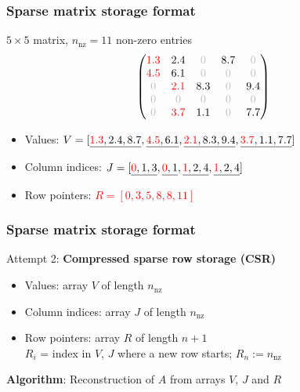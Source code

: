 \documentclass{beamer}
\begin{document}

\begin{frame}[fragile]
  \frametitle{Sparse matrix storage format}
  $5\times 5$ matrix, $n_{\text{nz}}=11$ non-zero entries
$$
\begin{pmatrix}
\textcolor{red}{1.3} & 2.4 & \textcolor{lightgray}{0} & 8.7 & \textcolor{lightgray}{0} \\
\textcolor{red}{4.5} & 6.1 & \textcolor{lightgray}{0} & \textcolor{lightgray}{0} & \textcolor{lightgray}{0} \\
\textcolor{lightgray}{0} & \textcolor{red}{2.1} & 8.3 & \textcolor{lightgray}{0} & 9.4 \\
\textcolor{lightgray}{0} & \textcolor{lightgray}{0} & \textcolor{lightgray}{0} & \textcolor{lightgray}{0} & \textcolor{lightgray}{0} \\
\textcolor{lightgray}{0} & \textcolor{red}{3.7} & 1.1 & \textcolor{lightgray}{0} & 7.7
\end{pmatrix}
$$
\begin{itemize}
  \item Values: $V=[\underline{\textcolor{red}{1.3}, 2.4, 8.7}, \underline{\textcolor{red}{4.5}, 6.1}, \underline{\textcolor{red}{2.1}, 8.3, 9.4}, \underline{\textcolor{red}{3.7}, 1.1, 7.7}]$
  \item Column indices: $J=[\underline{\textcolor{red}{0},1,3},\underline{\textcolor{red}{0},1},\underline{\textcolor{red}{1},2,4},\underline{\textcolor{red}{1},2,4}]$
  \item Row pointers: \textcolor{red}{$R=[0,3,5,8,8,11]$}
\end{itemize}
\end{frame}


\begin{frame}[fragile]
  \frametitle{Sparse matrix storage format}
  Attempt 2: \textbf{Compressed sparse row storage (CSR)}
  \begin{itemize}
  \item Values: array $V$ of length $n_{\text{nz}}$
  \item Column indices: array $J$ of length $n_{\text{nz}}$
  \item Row pointers: array $R$ of length $n+1$\\
     $R_i$ = index in $V$, $J$ where a new row starts; $R_{n} := n_{\text{nz}}$
  \end{itemize}
  \vspace{2ex}
  \textbf{Algorithm}: Reconstruction of $A$ from arrays $V$, $J$ and $R$
  \begin{algorithmic}[1]
      \EndFor
    \EndFor
  \end{algorithmic}
\end{frame}
\end{document}
